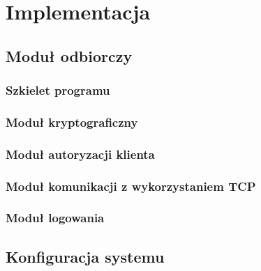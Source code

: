 \chapter{Implementacja}
\label{chap:Implementacja}

\section[Moduł odbiorczy][Moduł odbiorczy]{Moduł odbiorczy}

\subsection[Szkielet programu][Szkielet programu]{Szkielet programu}

\subsection[Moduł kryptograficzny][Moduł kryptograficzny]{Moduł kryptograficzny}

\subsection[Moduł autoryzacyjny][Moduł autoryzacji klienta]{Moduł autoryzacji klienta}

\subsection[Moduł TCP][Moduł komunikacji z wykorzystaniem TCP]{Moduł komunikacji z wykorzystaniem TCP}

\subsection[Moduł logowania][Moduł logowania]{Moduł logowania}

\section[Konfiguracja systemu][Konfiguracja systemu]{Konfiguracja systemu}